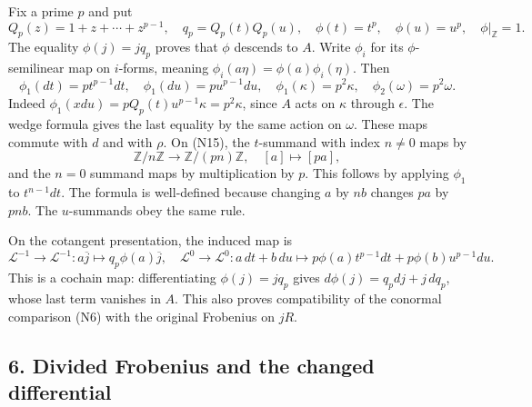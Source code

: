 \documentclass[
]{article}
\begin{document}
Fix a prime \(p\) and put \[
Q_p(z)=1+z+\cdots+z^{p-1},\quad q_p=Q_p(t)Q_p(u),
\quad\phi(t)=t^p,\quad\phi(u)=u^p,\quad\phi|_{\mathbb Z}=1.
\tag{N16}
\] The equality \(\phi(j)=jq_p\) proves that \(\phi\) descends to \(A\).
Write \(\phi_i\) for its \(\phi\)-semilinear map on \(i\)-forms, meaning
\(\phi_i(a\eta)=\phi(a)\phi_i(\eta)\). Then \[
\phi_1(dt)=p t^{p-1}dt,\quad
\phi_1(du)=p u^{p-1}du,\quad
\phi_1(\kappa)=p^2\kappa,\quad
\phi_2(\omega)=p^2\omega.
\tag{N17}
\] Indeed \(\phi_1(xdu)=pQ_p(t)u^{p-1}\kappa=p^2\kappa\), since \(A\)
acts on \(\kappa\) through \(\epsilon\). The wedge formula gives the
last equality by the same action on \(\omega\). These maps commute with
\(d\) and with \(\rho\). On (N15), the \(t\)-summand with index
\(n\ne0\) maps by \[
\mathbb Z/n\mathbb Z\longrightarrow\mathbb Z/(pn)\mathbb Z,
\quad [a]\longmapsto[pa],
\tag{N18}
\] and the \(n=0\) summand maps by multiplication by \(p\). This follows
by applying \(\phi_1\) to \(t^{n-1}dt\). The formula is well-defined
because changing \(a\) by \(nb\) changes \(pa\) by \(pnb\). The
\(u\)-summands obey the same rule.

On the cotangent presentation, the induced map is \[
\mathcal L^{-1}\to\mathcal L^{-1}:a\overline j\longmapsto q_p\phi(a)\overline j,
\quad
\mathcal L^0\to\mathcal L^0:
a\,dt+b\,du\longmapsto p\phi(a)t^{p-1}dt+p\phi(b)u^{p-1}du.
\tag{N19}
\] This is a cochain map: differentiating \(\phi(j)=jq_p\) gives
\(d\phi(j)=q_p dj+j\,dq_p\), whose last term vanishes in \(A\). This
also proves compatibility of the conormal comparison (N6) with the
original Frobenius on \(jR\).

\subsection{6. Divided Frobenius and the changed
differential}\label{divided-frobenius-and-the-changed-differential}
\end{document}

